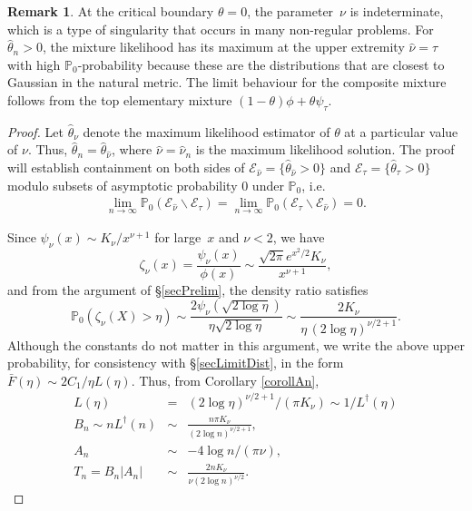 \documentclass[11pt]{article}
\theoremstyle{definition}
\newtheorem{remark}{Remark}[section]
\def\Prob{{\mathbb P}}
\begin{document}
\begin{remark}
	At the critical boundary $\theta=0$, the parameter~$\nu$ is indeterminate, which is a type of singularity that occurs in many non-regular problems.
	For $\hat\theta_n > 0$, the mixture likelihood has its maximum at the upper extremity $\hat\nu = \tau$ with high $\Prob_0$-probability because these are the distributions that are closest to Gaussian in the natural metric.  
	The limit behaviour for the composite mixture follows from the top elementary mixture $(1-\theta)\phi + \theta \psi_\tau$.
\end{remark}


\begin{proof}
	Let $\hat\theta_\nu$ denote the maximum likelihood estimator of $\theta$ at a particular value of $\nu$. Thus, $\hat\theta_n=\hat \theta_{\hat\nu}$, where $\hat\nu=\hat\nu_n$ is the maximum likelihood solution. The proof will establish containment on both sides of ${\mathcal{E}_{\hat\nu}=\{\hat\theta_{\hat\nu}>0\}}$ and ${\mathcal{E}_\tau=\{\hat\theta_\tau>0\}}$ modulo subsets of asymptotic probability 0 under $\Prob_0$, i.e.
	\begin{align*}
	\lim_{n\to\infty} \Prob_0(\mathcal{E}_{\hat{\nu}}\backslash \mathcal{E}_\tau)=\lim_{n\to\infty} \Prob_0(\mathcal{E}_{\tau}\backslash \mathcal{E}_{\hat{\nu}})=0 .
	\end{align*}
	
	Since $\psi_\nu(x) \sim K_\nu/x^{\nu+1}$ for large~$x$ and $\nu < 2$, we have
	\[
	\zeta_\nu(x) = \frac{\psi_\nu(x)} {\phi(x)} \sim \frac{\sqrt{2\pi} e^{x^2\!/2} K_\nu} { x^{\nu+1}},
	\]
	and from the argument of \S \ref{secPrelim}, the density ratio satisfies
	\[
	\Prob_0(\zeta_\nu(X) > \eta) \sim \frac{2 \psi_\nu( \sqrt{2\log \eta})}{\eta \sqrt{2\log \eta}} \sim \frac{2 K_\nu} {\eta \, (2\log\eta)^{\nu/2+1}}.
	\]
	Although the constants do not matter in this argument, we write the above upper probability, for consistency with \S \ref{secLimitDist}, in the form $\bar F(\eta)\sim 2 C_1/\eta L(\eta)$. Thus, from Corollary \ref{corollAn},
	\begin{eqnarray*}
		L(\eta) &=& (2\log\eta)^{\nu/2 + 1} / (\pi K_\nu) \sim 1/L^\dagger(\eta)\\
		B_n \sim n L^\dagger(n) &\sim& \frac{n \pi K_\nu} {(2\log n)^{\nu/2 +1}}, \\
		A_n &\sim& -4\log n/(\pi\nu), 
		\\
		T_n = B_n |A_n| &\sim& \frac{2n K_\nu} {\nu (2\log n)^{\nu/2}}.
	\end{eqnarray*}
	

\end{proof}
\end{document}
